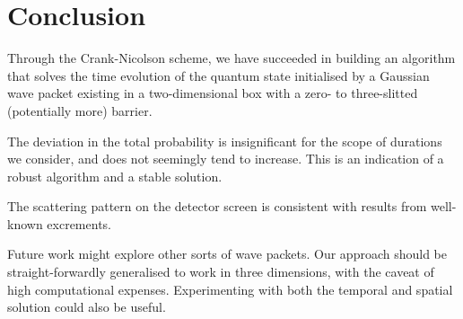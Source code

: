 \section{Conclusion}\label{sec:conclusion}

Through the Crank-Nicolson scheme, we have succeeded in building an algorithm that solves the time evolution of the quantum state initialised by a Gaussian wave packet existing in a two-dimensional box with a zero- to three-slitted (potentially more) barrier.

The deviation in the total probability is insignificant for the scope of durations we consider, and does not seemingly tend to increase. This is an indication of a robust algorithm and a stable solution.

The scattering pattern on the detector screen is consistent with results from well-known excrements.

Future work might explore other sorts of wave packets. Our approach should be straight-forwardly generalised to work in three dimensions, with the caveat of high computational expenses. Experimenting with both the temporal and spatial solution could also be useful.



